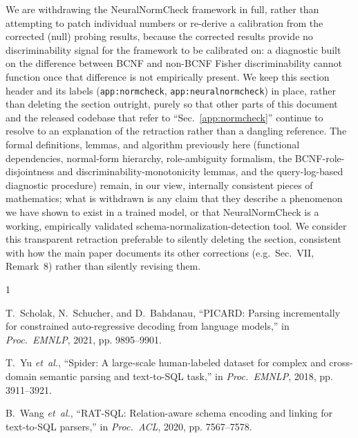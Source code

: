 \documentclass[conference]{IEEEtran}
\begin{document}
We are withdrawing the NeuralNormCheck framework in full, rather than attempting to patch individual numbers or re-derive a calibration from the corrected (null) probing results, because the corrected results provide no discriminability signal for the framework to be calibrated on: a diagnostic built on the difference between BCNF and non-BCNF Fisher discriminability cannot function once that difference is not empirically present. We keep this section header and its labels (\texttt{app:normcheck}, \texttt{app:neuralnormcheck}) in place, rather than deleting the section outright, purely so that other parts of this document and the released codebase that refer to ``Sec.~\ref{app:normcheck}'' continue to resolve to an explanation of the retraction rather than a dangling reference. The formal definitions, lemmas, and algorithm previously here (functional dependencies, normal-form hierarchy, role-ambiguity formalism, the BCNF-role-disjointness and discriminability-monotonicity lemmas, and the query-log-based diagnostic procedure) remain, in our view, internally consistent pieces of mathematics; what is withdrawn is any claim that they describe a phenomenon we have shown to exist in a trained model, or that NeuralNormCheck is a working, empirically validated schema-normalization-detection tool. We consider this transparent retraction preferable to silently deleting the section, consistent with how the main paper documents its other corrections (e.g.\ Sec.~VII, Remark~8) rather than silently revising them.

\begin{thebibliography}{1}
\providecommand{\url}[1]{#1}
\providecommand{\newblock}{\relax}
\providecommand{\bibinfo}[2]{#2}

T.~Scholak, N.~Schucher, and D.~Bahdanau, ``{PICARD}: Parsing incrementally
  for constrained auto-regressive decoding from language models,'' in
  \emph{Proc.\ EMNLP}, 2021, pp. 9895--9901.

T.~Yu \emph{et~al.}, ``{Spider}: A large-scale human-labeled dataset for
  complex and cross-domain semantic parsing and text-to-{SQL} task,'' in
  \emph{Proc.\ EMNLP}, 2018, pp. 3911--3921.

B.~Wang \emph{et~al.}, ``{RAT-SQL}: Relation-aware schema encoding and linking
  for text-to-{SQL} parsers,'' in \emph{Proc.\ ACL}, 2020, pp. 7567--7578.

\end{thebibliography}
\end{document}
